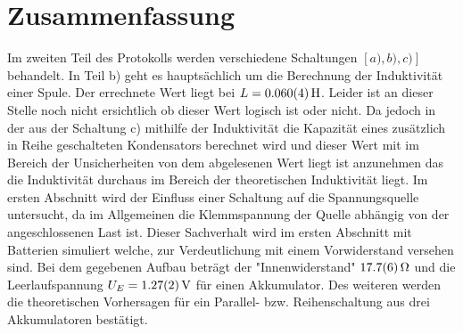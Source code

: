 
\section{Zusammenfassung}
Im zweiten Teil des Protokolls werden verschiedene Schaltungen  $\left[ a),b),c) \right]$ behandelt.
In Teil b) geht es hauptsächlich um die Berechnung der Induktivität einer Spule.
Der errechnete Wert liegt bei $L= \SI{0,060+-0,004}{H}$. Leider ist an dieser Stelle noch nicht ersichtlich ob dieser Wert 
logisch ist oder nicht.
Da jedoch in der aus der Schaltung c) mithilfe der Induktivität die Kapazität eines zusätzlich in Reihe geschalteten Kondensators berechnet wird und dieser Wert mit im Bereich der Unsicherheiten von dem abgelesenen Wert liegt ist anzunehmen das die Induktivität durchaus im Bereich der theoretischen Induktivität liegt.
Im ersten Abschnitt wird der Einfluss einer Schaltung auf die Spannungsquelle untersucht, da im Allgemeinen die Klemmspannung der Quelle abhängig von der angeschlossenen Last ist. Dieser Sachverhalt wird im ersten Abschnitt mit Batterien simuliert welche, zur Verdeutlichung mit einem Vorwiderstand versehen sind. Bei dem gegebenen Aufbau beträgt der "Innenwiderstand" $\SI{17.7+-0.6}{\ohm}$ und die Leerlaufspannung $U_E=\SI{1.27+-0.02}{V}$ für einen Akkumulator. Des weiteren werden die theoretischen Vorhersagen für ein Parallel- bzw. Reihenschaltung aus drei Akkumulatoren bestätigt.

